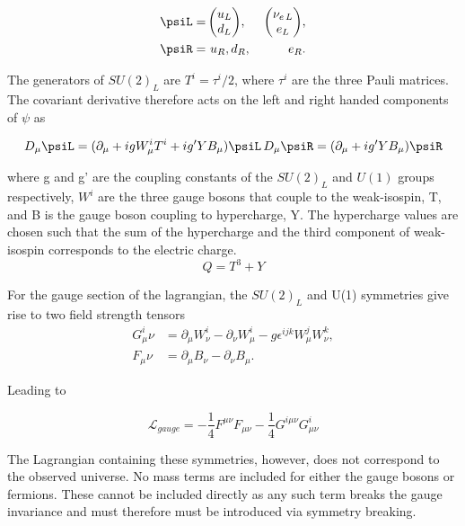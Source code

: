 \begin{align}
\qquad\qquad\qquad\psiL =\,&{\begin{pmatrix} u_L \\ d_L \end{pmatrix}},\, &{\begin{pmatrix} \nu_{e\,L} \\ e_L \end{pmatrix}},\nonumber\qquad\qquad\qquad\\
\qquad\qquad\qquad\psiR = \,&\,u_R,d_R,\, &\,e_R.\qquad\qquad\qquad
\end{align}

The generators of $SU(2)_L$ are $T^i = \tau^i/2$, where $\tau^i$ are the three Pauli matrices. 
The covariant derivative therefore acts on the left and right handed components of $\psi$ as

\begin{equation}
D_{\mu} \psiL = (\partial_\mu + igW^i_{\mu}T^i + ig'YB_\mu)\psiL \, D_{\mu} \psiR = (\partial_\mu + ig'YB_\mu)\psiR
\end{equation}

where g and g' are the coupling constants of the $SU(2)_L$ and $U(1)$ groups respectively, 
$W^i$ are the three gauge bosons that couple to the weak-isospin, T, and B is the gauge boson
coupling to hypercharge, Y. The hypercharge values are chosen such that the sum of the hypercharge and 
the third component of weak-isospin corresponds to the electric charge.
\begin{equation}
\label{equ:charge}
Q = T^{3} + Y
\end{equation}

For the gauge section of the lagrangian, the $SU(2)_L$ and U(1) symmetries give rise to two field strength tensors
\begin{align}
G^i_\mu\nu &= \partial_\mu W^i_\nu - \partial_\nu W^i_\mu - g \epsilon^{ijk}W^j_\mu W^k_\nu,\\
F_\mu\nu &= \partial_\mu B_\nu - \partial_\nu B_\mu.
\end{align}

Leading to

\begin{equation}
\mathcal{L}_{gauge} = -\frac{1}{4}F^{\mu\nu}F_{\mu\nu} - \frac{1}{4}G^{i\mu\nu}G^{i}_{\mu\nu}
\end{equation}

The Lagrangian containing these symmetries, however, does not correspond to the observed universe. No mass terms
are included for either the gauge bosons or fermions. These cannot be included directly as any such term breaks 
the gauge invariance and must therefore must be introduced via symmetry breaking.

